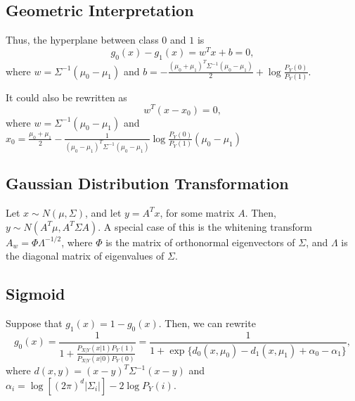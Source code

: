 \documentclass{article}
\newenvironment{topic}[1]{\subsection*{#1}}{}
\begin{document}
\begin{topic}{Geometric Interpretation}
    Thus, the hyperplane between class $0$ and $1$ is 
    \[
        g_0(x) - g_1(x) = w^Tx + b = 0,
    \]
    where $w = \Sigma^{-1}(\mu_0 - \mu_1)$ and $b = -\frac{(\mu_0 + \mu_1)^T\Sigma^{-1}(\mu_0 - \mu_1)}{2} + \log \frac{P_Y(0)}{P_Y(1)}$.

    It could also be rewritten as
    \[
        w^T(x - x_0) = 0,
    \]
    where $w = \Sigma^{-1}(\mu_0 - \mu_1)$ and $x_0 = \frac{\mu_0 + \mu_1}{2} - \frac{1}{(\mu_0 - \mu_1)^T\Sigma^{-1}(\mu_0 - \mu_1)} \log \frac{P_Y(0)}{P_Y(1)}(\mu_0 - \mu_1)$
\end{topic}

\begin{topic}{Gaussian Distribution Transformation}
    Let $x \sim N(\mu, \Sigma)$, and let $y = A^Tx$, for some matrix $A$. Then, $y \sim N(A^T\mu, A^T\Sigma A)$. A special case of this is the whitening transform $A_w = \Phi\Lambda^{-1/2}$, where $\Phi$ is the matrix of orthonormal eigenvectors of $\Sigma$, and $\Lambda$ is the diagonal matrix of eigenvalues of $\Sigma$.
\end{topic}

\begin{topic}{Sigmoid}
    Suppose that $g_1(x) = 1 - g_0(x)$. Then, we can rewrite
    \[
        g_0(x) = \frac{1}{1 + \frac{P_{X|Y}(x|1)P_Y(1)}{P_{X|Y}(x|0)P_Y(0)}} = \frac{1}{1 + \exp\{d_0(x, \mu_0) - d_1(x, \mu_1) + \alpha_0 - \alpha_1\}},
    \]
    where $d(x, y) = (x - y)^T\Sigma^{-1}(x - y)$ and $\alpha_i = \log \left[(2\pi)^d|\Sigma_i|\right] - 2\log P_Y(i)$.
\end{topic}
\end{document}
